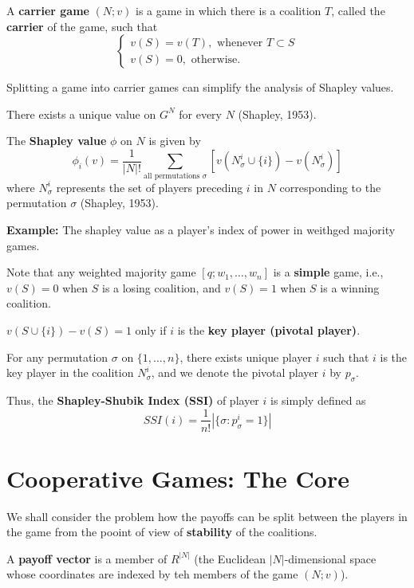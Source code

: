 \documentclass[11pt,a4paper]{article}
\newcommand{\note}[1]{%
    \begin{tcolorbox}[title=\textbf{Note},fonttitle=\bfseries,coltitle=textgray]
        #1
    \end{tcolorbox}
}
\begin{document}
A \textbf{carrier game} $(N; v)$ is a game in which there is a coalition $T$, called the \textbf{carrier} of the game, such that
\[
\begin{cases}
    v(S) = v(T), \text{  whenever } T \subset S \\
    v(S) = 0, \text{  otherwise.}
\end{cases}
\]
\note{Splitting a game into carrier games can simplify the analysis of Shapley values.}

There exists a unique value on $G^N$ for every $N$ (Shapley, 1953). \par
The \textbf{Shapley value} $\phi$ on $N$ is given by
\[
\phi_i(v) = \frac{1}{|N|!} \sum_{\text{all permutations } \sigma} \left[v(N_{\sigma}^i \cup \{i\}) - v(N_{\sigma}^i)\right]
\]
where $N_{\sigma}^i$ represents the set of players preceding $i$ in $N$ corresponding to the permutation $\sigma$ (Shapley, 1953). \par


\textbf{Example:} The shapley value as a player's index of power in weithged majority games. \par

Note that any weighted majority game $[q; w_1, \dots, w_n]$ is a \textbf{simple} game, i.e., $v(S) = 0$ when $S$ is a losing coalition, and $v(S) = 1$ when $S$ is a winning coalition. \par
$v(S \cup \{i\}) - v(S) = 1$ only if $i$ is the \textbf{key player (pivotal player)}. \par
For any permutation $\sigma$ on $\{1, \dots, n\}$, there exists unique player $i$ such that $i$ is the key player in the coalition $N_{\sigma}^i$, and we denote the pivotal player $i$ by $p_{\sigma}$. \par
Thus, the \textbf{Shapley-Shubik Index (SSI)} of player $i$ is simply defined as
\[
SSI(i) = \frac{1}{n!} \left|\{\sigma: p_{\sigma}^i = 1\}\right|
\]

\section{Cooperative Games: The Core}
We shall consider the problem how the payoffs can be split between the players in the game from the pooint of view of \textbf{stability} of the coalitions. \par

A \textbf{payoff vector} is a member of $R^{|N|}$ (the Euclidean $|N|$-dimensional space whose coordinates are indexed by teh members of the game $(N; v)$). \par
\end{document}
